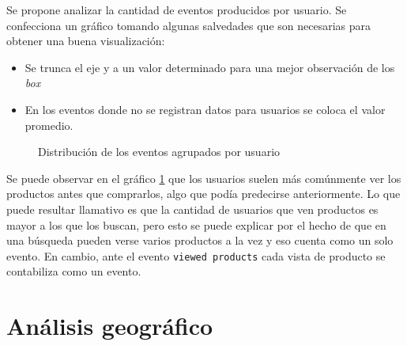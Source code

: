 \documentclass[a4paper]{article}
\begin{document}
Se propone analizar la cantidad de eventos producidos por usuario. Se confecciona un gráfico tomando algunas salvedades que son necesarias para obtener una buena visualización:

\begin{itemize}
	\item Se trunca el eje y a un valor determinado para una mejor observación de los \textit{box}
	\item En los eventos donde no se registran datos para usuarios se coloca el valor promedio.
\end{itemize}


\begin{figure}[h!]
	\caption{Distribución de los eventos agrupados por usuario}
	\label{fig:boxplot}
\end{figure}

Se puede observar en el gráfico \ref{fig:boxplot} que los usuarios suelen más comúnmente ver los productos antes que comprarlos, algo que podía predecirse anteriormente. Lo que puede resultar llamativo es que la cantidad de usuarios que ven productos es mayor a los que los buscan, pero esto se puede explicar por el hecho de que en una búsqueda pueden verse varios productos a la vez y eso cuenta como un solo evento. En cambio, ante el evento \texttt{viewed products} cada vista de producto se contabiliza como un evento.

\section{Análisis geográfico}
\end{document}
